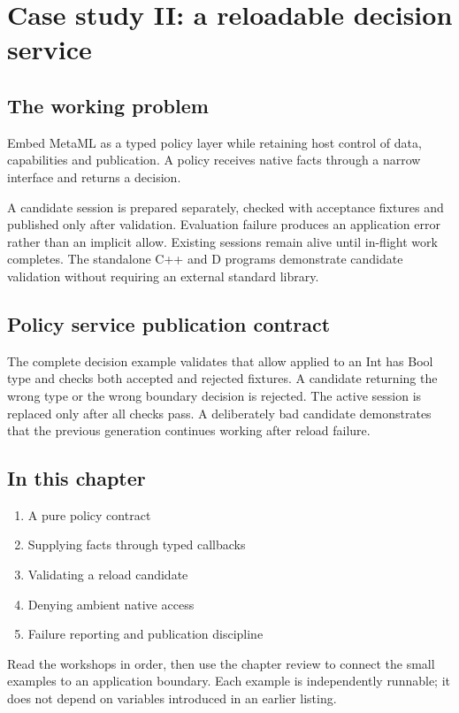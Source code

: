 \chapter{Case study II: a reloadable decision service}\label{ch:24}
\section*{The working problem}
Embed MetaML as a typed policy layer while retaining host control of data, capabilities and publication. A policy receives native facts through a narrow interface and returns a decision.

A candidate session is prepared separately, checked with acceptance fixtures and published only after validation. Evaluation failure produces an application error rather than an implicit allow. Existing sessions remain alive until in-flight work completes. The standalone C++ and D programs demonstrate candidate validation without requiring an external standard library.

\section*{Policy service publication contract}
The complete decision example validates that allow applied to an Int has Bool type and checks both accepted and rejected fixtures. A candidate returning the wrong type or the wrong boundary decision is rejected. The active session is replaced only after all checks pass. A deliberately bad candidate demonstrates that the previous generation continues working after reload failure.

\section*{In this chapter}
\begin{enumerate}
\item A pure policy contract
\item Supplying facts through typed callbacks
\item Validating a reload candidate
\item Denying ambient native access
\item Failure reporting and publication discipline
\end{enumerate}
Read the workshops in order, then use the chapter review to connect the small examples to an application boundary. Each example is independently runnable; it does not depend on variables introduced in an earlier listing.

